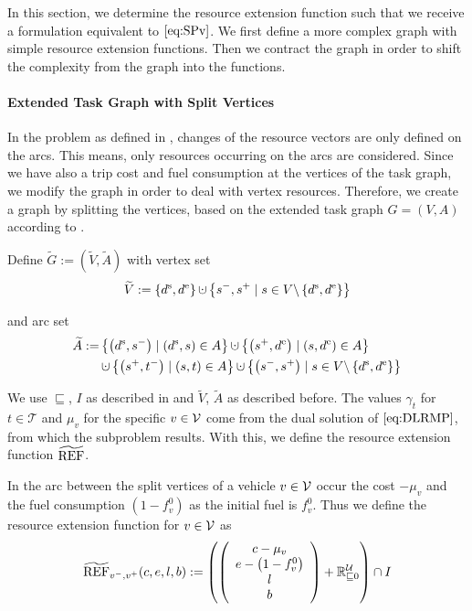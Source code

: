 In this section, we determine the resource extension function such that we receive a formulation equivalent to $\eqref{eq:SPv}$. We first define a more complex graph with simple resource extension functions. Then we contract the graph in order to shift the complexity from the graph into the functions.

\paragraph{Extended Task Graph with Split Vertices} \parfill

In the problem as defined in , changes of the resource vectors are only defined on the arcs. This means, only resources occurring on the arcs are considered. Since we have also a trip cost and fuel consumption at the vertices of the task graph, we modify the graph in order to deal with vertex resources. Therefore, we create a graph by splitting the vertices, based on the extended task graph $G=(V,A)$ according to . 

Define ${\widetilde{G} := \left(\widetilde{V},\widetilde{A}\right)}$ with vertex set
\begin{align*}
	\widetilde{V} := \left\{\ds,\de\right\}\cupdot\left\{s^-,s^+\mid s\in V\backslash\left\{\ds,\de\right\}\right\}
\end{align*}

and arc set
\begin{align*}
	\widetilde{A} := & \left\{\left(\ds,s^-\right)\mid \left(\ds,s\right)\in A\right\}\cupdot\left\{\left(s^+,\de\right)\mid\left(s,\de\right)\in A\right\} \\
	& \cupdot\left\{\left(s^+,t^-\right)\mid (s,t)\in A\right\}\cupdot\left\{\left(s^-,s^+\right)\mid s\in V\backslash\left\{\ds,\de\right\}\right\}
\end{align*}

We use $\sqsubseteq$, $I$ as described in  and $\widetilde{V}$, $\widetilde{A}$ as described before. The values $\gamma_t$ for $t\in\mathcal{T}$ and $\mu_v$ for the specific $v\in\mathcal{V}$ come from the dual solution of $\eqref{eq:DLRMP}$, from which the subproblem results. With this, we define the resource extension function $\widetilde{\operatorname{REF}}$. 

In the arc between the split vertices of a vehicle $v\in\mathcal{V}$ occur the cost $-\mu_v$ and the fuel consumption $\left(1-f^0_v\right)$ as the initial fuel is $f^0_v$. Thus we define the resource extension function for $v\in\mathcal{V}$ as
\begin{align*}
	\widetilde{\operatorname{REF}}_{v^-,v^+}(c,e,l,b) := \left(\left(
	\begin{array}{c}
		c-\mu_v \\ e-\left(1-f^0_v\right) \\ l \\ b
	\end{array}
	\right) + \mathbb{R}^{\mathcal{U}}_{\sqsubseteq 0}\right) \cap I
\end{align*}

